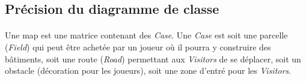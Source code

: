 \documentclass[a4paper,11pt]{report}
\begin{document}
\newpage
\subsection{Précision du diagramme de classe}
\paragraph{}
Une map est une matrice contenant des \textit{Case}. Une \textit{Case} est soit une parcelle (\textit{Field}) qui peut être achetée par un joueur où il pourra y construire des bâtiments, soit une route (\textit{Road}) permettant aux \textit{Visitors} de se déplacer, soit un obstacle (décoration  pour les joueurs), soit une zone d'entré pour les \textit{Visitors}. 

\newpage

\printindex
\end{document}
